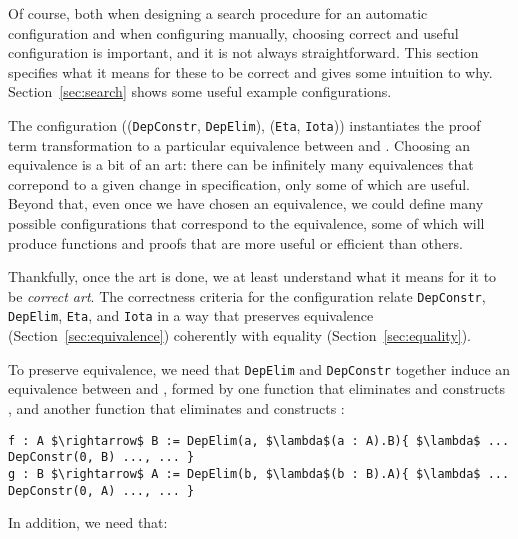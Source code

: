 Of course, both when designing a search procedure for an automatic configuration and when
configuring \toolname manually, choosing correct and useful configuration is important,
and it is not always straightforward. This section specifies what it means for these
to be correct and gives some intuition to why.
Section~\ref{sec:search} shows some useful example configurations.

The configuration ((\lstinline{DepConstr}, \lstinline{DepElim}), (\lstinline{Eta}, \lstinline{Iota})) instantiates
the proof term transformation to a particular equivalence between \A and \B.
Choosing an equivalence is a bit of an art:
there can be infinitely many equivalences that correpond to a 
given change in specification, only some of which are useful.
Beyond that, even once we have chosen an equivalence, we could define many possible configurations that correspond
to the equivalence, some of which will produce functions and proofs that are more useful or efficient than others.

Thankfully, once the art is done, we at least understand what it means for it to be \textit{correct art}.
The correctness criteria for the configuration relate \lstinline{DepConstr}, \lstinline{DepElim}, \lstinline{Eta}, and \lstinline{Iota}
in a way that preserves equivalence (Section~\ref{sec:equivalence}) coherently with equality (Section~\ref{sec:equality}).

To preserve equivalence, we need that \lstinline{DepElim} and \lstinline{DepConstr} together induce an equivalence between \A and \B,
formed by one function that eliminates \A and constructs \B, and another function that eliminates \B and constructs \A:

\begin{lstlisting}
f : A $\rightarrow$ B := DepElim(a, $\lambda$(a : A).B){ $\lambda$ ... DepConstr(0, B) ..., ... }
g : B $\rightarrow$ A := DepElim(b, $\lambda$(b : B).A){ $\lambda$ ... DepConstr(0, A) ..., ... }
\end{lstlisting}
In addition, we need that:

